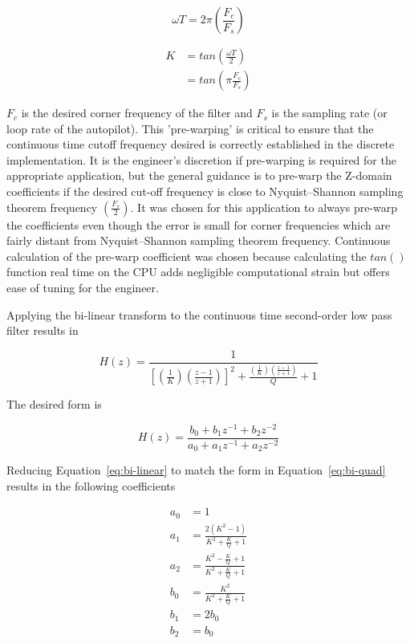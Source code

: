 \begin{equation}
 \omega T = 2\pi\left(\frac{F_c}{F_s}\right)
\end{equation}

\begin{equation}
\begin{split}
 K &= tan\left(\frac{\omega T}{2}\right) \\
 &= tan\left(\pi\frac{F_c}{F_s}\right)
\end{split}
\end{equation}



$F_c$ is the desired corner frequency of the filter and $F_s$ is the sampling rate (or loop rate of the autopilot).
This 'pre-warping' is critical to ensure that the continuous time cutoff frequency desired is correctly established in the discrete implementation.  It is the engineer's discretion if pre-warping is required for the appropriate application, but the general guidance is to pre-warp the Z-domain coefficients if the desired cut-off frequency is close to Nyquist–Shannon sampling theorem frequency $(\frac{F_s}{2})$.  It was chosen for this application to always pre-warp the coefficients even though the error is small for corner frequencies which are fairly distant from Nyquist–Shannon sampling theorem frequency.  Continuous calculation of the pre-warp coefficient was chosen because calculating the $tan()$ function real time on the CPU adds negligible computational strain but offers ease of tuning for the engineer.

Applying the bi-linear transform to the continuous time second-order low pass filter results in

\begin{equation}\label{eq:bi-linear}
 H(z) = \frac{1}{ \left[\left(\frac{1}{K}\right)\left(\frac{z-1}{z+1}\right)\right]^2+\frac{ \left(\frac{1}{K}\right)\left(\frac{z-1}{z+1}\right)}{Q}+1}
\end{equation}

The desired form is

\begin{equation}\label{eq:bi-quad}
 H(z) = \frac{b_0 + b_1 z^{-1} + b_2 z^{-2}}{a_0 + a_1 z^{-1} + a_2 z^{-2}}
\end{equation}

Reducing Equation~\ref{eq:bi-linear} to match the form in Equation~\ref{eq:bi-quad} results in the following coefficients

\begin{equation}
\begin{split}
 a_0 &= 1 \\
 a_1 &= \frac{2(K^2-1)}{K^2+\frac{K}{Q}+1} \\
 a_2 &= \frac{K^2-\frac{K}{Q}+1}{K^2+\frac{K}{Q}+1} \\
 b_0 &= \frac{K^2}{K^2+\frac{K}{Q}+1} \\
 b_1 &= 2b_0 \\
 b_2 &= b_0  
\end{split}
\end{equation}


